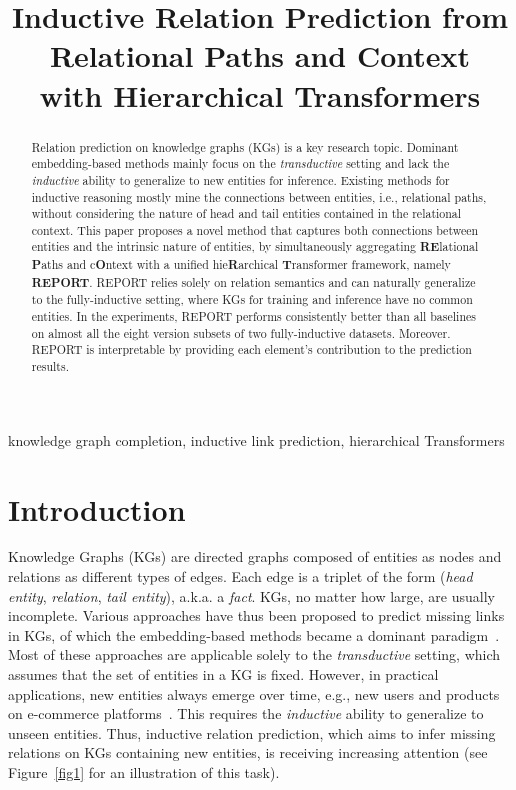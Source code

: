 \documentclass{article}
\title{Inductive Relation Prediction from Relational Paths and Context\\ with Hierarchical Transformers}
\begin{document}
\ninept
%
\maketitle
%
\begin{abstract}
Relation prediction on knowledge graphs (KGs) is a key research topic.
Dominant embedding-based methods mainly focus on the \textit{transductive} setting and lack the \textit{inductive} ability to generalize to new entities for inference.
Existing methods for inductive reasoning mostly mine the connections between entities, i.e., relational paths,
without considering the nature of head and tail entities contained in the relational context. 
This paper proposes a novel method that captures both connections between entities and the intrinsic nature of entities, by simultaneously aggregating \textbf{RE}lational \textbf{P}aths and c\textbf{O}ntext with a unified hie\textbf{R}archical \textbf{T}ransformer framework, namely \textbf{REPORT}.
REPORT relies solely on relation semantics and can naturally generalize to the fully-inductive setting, where KGs for training and inference have no common entities.
In the experiments,
REPORT performs consistently better than all baselines on almost all the eight version subsets of two fully-inductive datasets.
Moreover. REPORT is interpretable by providing each element's contribution to the prediction results.
\end{abstract}
%
\begin{keywords}
knowledge graph completion, inductive link prediction, hierarchical Transformers
\end{keywords}
%
\section{Introduction}
Knowledge Graphs (KGs) are directed graphs composed of entities as nodes and relations as different types of edges. Each edge is a triplet of the form (\textit{head entity}, \textit{relation}, \textit{tail entity}), a.k.a. a \textit{fact}.
KGs, no matter how large, are usually incomplete. Various approaches have thus been proposed to predict missing links in KGs, of which the embedding-based methods became a dominant paradigm~\cite{transe,conve}. 
Most of these approaches are applicable solely to the \textit{transductive} setting, which assumes that the set of entities in a KG is fixed. 
However, in practical applications, new entities always emerge over time, e.g., new users and products on e-commerce platforms~\cite{grail}. This requires the \textit{inductive} ability to generalize to unseen entities.
Thus, inductive relation prediction, which aims to infer missing relations on KGs containing new entities, is receiving increasing attention (see Figure~\ref{fig1} for an illustration of this task).
\end{document}
